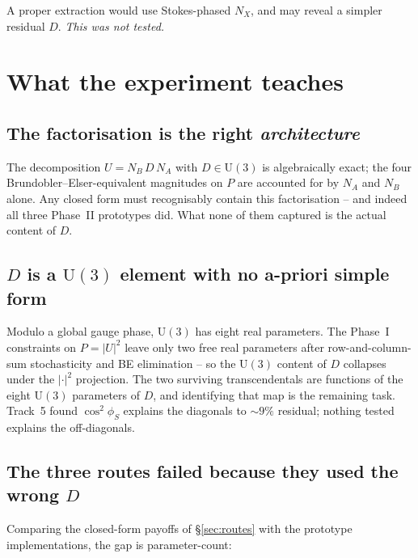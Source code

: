 \documentclass[11pt]{article}
\begin{document}
A proper extraction would use Stokes-phased $N_X$, and may reveal a
simpler residual $D$. \emph{This was not tested.}

\section{What the experiment teaches}

\subsection{The factorisation is the right \emph{architecture}}

The decomposition $U = N_B\,D\,N_A$ with $D\in \mathrm U(3)$ is
algebraically exact; the four Brundobler--Elser-equivalent magnitudes
on $P$ are accounted for by $N_A$ and $N_B$ alone. Any closed form must
recognisably contain this factorisation -- and indeed all three Phase~II
prototypes did. What none of them captured is the actual content of $D$.

\subsection{$D$ is a $\mathrm U(3)$ element with no a-priori simple form}

Modulo a global gauge phase, $\mathrm U(3)$ has eight real parameters.
The Phase~I constraints on $P=|U|^2$ leave only two free real parameters
after row-and-column-sum stochasticity and BE elimination -- so the
$\mathrm U(3)$ content of $D$ collapses under the $|\cdot|^2$ projection.
The two surviving transcendentals are functions of the eight
$\mathrm U(3)$ parameters of $D$, and identifying that map is the
remaining task. Track~5 found $\cos^2\phi_S$ explains the diagonals to
$\sim 9\%$ residual; nothing tested explains the off-diagonals.

\subsection{The three routes failed because they used the wrong $D$}

Comparing the closed-form payoffs of \S\ref{sec:routes} with the
prototype implementations, the gap is parameter-count:
\end{document}
